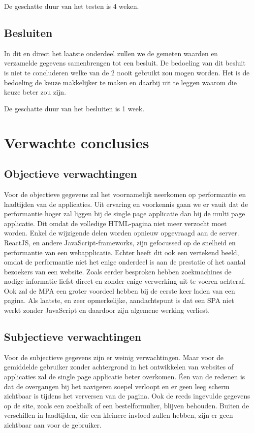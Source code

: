 \documentclass{hogent-article}
\begin{document}
De geschatte duur van het testen is 4 weken.

\subsection{Besluiten}
In dit en direct het laatste onderdeel zullen we de gemeten waarden en verzamelde gegevens samenbrengen tot een besluit.
De bedoeling van dit besluit is niet te concluderen welke van de 2 nooit gebruikt zou mogen worden.
Het is de bedoeling de keuze makkelijker te maken en daarbij uit te leggen waarom die keuze beter zou zijn.

De geschatte duur van het besluiten is 1 week.


\section{Verwachte conclusies}

\subsection{Objectieve verwachtingen}
Voor de objectieve gegevens zal het voornamelijk neerkomen op performantie en laadtijden van de applicaties.
Uit ervaring en voorkennis gaan we er vauit dat de performantie hoger zal liggen bij de single page applicatie dan bij de multi page applicatie.
Dit omdat de volledige HTML-pagina niet meer verzocht moet worden. Enkel de wijzigende delen worden opnieuw opgevraagd aan de server.
ReactJS, en andere JavaScript-frameworks, zijn gefocussed op de snelheid en performantie van een webapplicatie.
Echter heeft dit ook een vertekend beeld, omdat de performantie niet het enige onderdeel is aan de prestatie of het aantal bezoekers van een website.
Zoals eerder besproken hebben zoekmachines de nodige informatie liefst direct en zonder enige verwerking uit te voeren achteraf.
Ook zal de MPA een groter voordeel hebben bij de eerste keer laden van een pagina.
Als laatste, en zeer opmerkelijke, aandachtspunt is dat een SPA niet werkt zonder JavaScript en daardoor zijn algemene werking verliest.

\subsection{Subjectieve verwachtingen}
Voor de subjectieve gegevens zijn er weinig verwachtingen.
Maar voor de gemiddelde gebruiker zonder achtergrond in het ontwikkelen van websites of applicaties zal de single page applicatie beter overkomen.
Éen van de redenen is dat de overgangen bij het navigeren soepel verloopt en er geen leeg scherm zichtbaar is tijdens het verversen van de pagina.
Ook de reeds ingevulde gegevens op de site, zoals een zoekbalk of een bestelformulier, blijven behouden.
Buiten de verschillen in laadtijden, die een kleinere invloed zullen hebben, zijn er geen zichtbaar aan voor de gebruiker.
\end{document}
